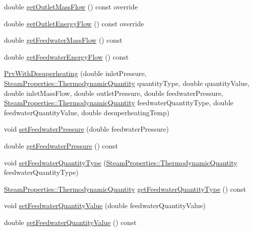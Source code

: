 \begin{DoxyCompactItemize}
\item 
double \hyperlink{class_prv_with_desuperheating_a76c03ff2f54c85cd0c80543f23549635}{get\+Outlet\+Mass\+Flow} () const override
\item 
double \hyperlink{class_prv_with_desuperheating_a2394fb62e4fc85252fc4eb15f08e9f1e}{get\+Outlet\+Energy\+Flow} () const override
\item 
double \hyperlink{class_prv_with_desuperheating_a9bd8ee7d5b563110a7279102352b8f4d}{get\+Feedwater\+Mass\+Flow} () const
\item 
double \hyperlink{class_prv_with_desuperheating_a42945a77fcdbaf1e1844c444c696f8b0}{get\+Feedwater\+Energy\+Flow} () const
\item 
\hyperlink{class_prv_with_desuperheating_adfd7f6866e8b953dcc41e51bb5b31b58}{Prv\+With\+Desuperheating} (double inlet\+Pressure, \hyperlink{class_steam_properties_ae0294bedf7d178c2d8fb6aed0f62fbff}{Steam\+Properties\+::\+Thermodynamic\+Quantity} quantity\+Type, double quantity\+Value, double inlet\+Mass\+Flow, double outlet\+Pressure, double feedwater\+Pressure, \hyperlink{class_steam_properties_ae0294bedf7d178c2d8fb6aed0f62fbff}{Steam\+Properties\+::\+Thermodynamic\+Quantity} feedwater\+Quantity\+Type, double feedwater\+Quantity\+Value, double desuperheating\+Temp)
\item 
void \hyperlink{class_prv_with_desuperheating_a8494ebf87e5bd834f621b0c7ca257fbe}{set\+Feedwater\+Pressure} (double feedwater\+Pressure)
\item 
double \hyperlink{class_prv_with_desuperheating_a260bbe19272694af509fb408a821b041}{get\+Feedwater\+Pressure} () const
\item 
void \hyperlink{class_prv_with_desuperheating_a3efaf028d1e6b8349a9e064605cc8d7a}{set\+Feedwater\+Quantity\+Type} (\hyperlink{class_steam_properties_ae0294bedf7d178c2d8fb6aed0f62fbff}{Steam\+Properties\+::\+Thermodynamic\+Quantity} feedwater\+Quantity\+Type)
\item 
\hyperlink{class_steam_properties_ae0294bedf7d178c2d8fb6aed0f62fbff}{Steam\+Properties\+::\+Thermodynamic\+Quantity} \hyperlink{class_prv_with_desuperheating_aa6901e00ecf819d95f79c20ef1775876}{get\+Feedwater\+Quantity\+Type} () const
\item 
void \hyperlink{class_prv_with_desuperheating_afc17940f7d61898eda1bb4a6f1fea8c3}{set\+Feedwater\+Quantity\+Value} (double feedwater\+Quantity\+Value)
\item 
double \hyperlink{class_prv_with_desuperheating_a8645a251b2e77e434a8bc51dfedcad69}{get\+Feedwater\+Quantity\+Value} () const

\end{DoxyCompactItemize}
